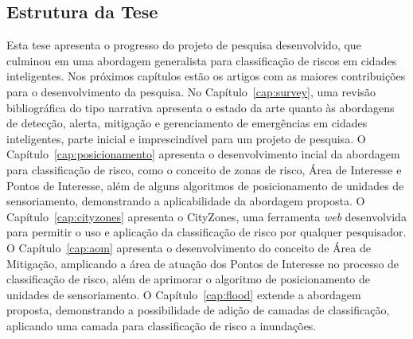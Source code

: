 \begin{refsection}
\section{Estrutura da Tese}\label{sec:estrutura}

Esta tese apresenta o progresso do projeto de pesquisa desenvolvido, que culminou em uma abordagem generalista para classificação de riscos em cidades inteligentes. Nos próximos capítulos estão os artigos com as maiores contribuições para o desenvolvimento da pesquisa. No Capítulo~\ref{cap:survey}, uma revisão bibliográfica do tipo narrativa apresenta o estado da arte quanto às abordagens de detecção, alerta, mitigação e gerenciamento de emergências em cidades inteligentes, parte inicial e imprescindível para um projeto de pesquisa. O Capítulo~\ref{cap:posicionamento} apresenta o desenvolvimento incial da abordagem para classificação de risco, como o conceito de zonas de risco, Área de Interesse e Pontos de Interesse, além de alguns algoritmos de posicionamento de unidades de sensoriamento, demonstrando a aplicabilidade da abordagem proposta. O Capítulo~\ref{cap:cityzones} apresenta o CityZones, uma ferramenta \emph{web} desenvolvida para permitir o uso e aplicação da classificação de risco por qualquer pesquisador. O Capítulo~\ref{cap:aom} apresenta o desenvolvimento do conceito de Área de Mitigação, amplicando a área de atuação dos Pontos de Interesse no processo de classificação de risco, além de aprimorar o algoritmo de posicionamento de unidades de sensoriamento. O Capítulo~\ref{cap:flood} extende a abordagem proposta, demonstrando a possibilidade de adição de camadas de classificação, aplicando uma camada para classificação de risco a inundações.

\printbibliography[heading=subbibliography]

\end{refsection}
